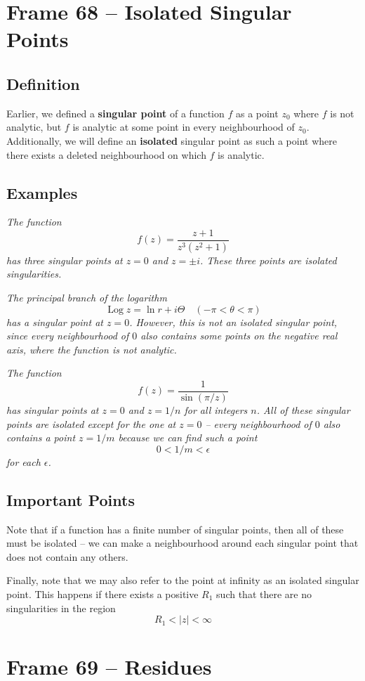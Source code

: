 \documentclass{article}
\renewcommand{\emph}{\textbf}
\DeclareMathOperator{\Log}{Log}
\begin{document}
\section{Frame 68 -- Isolated Singular Points}
\subsection{Definition}
Earlier, we defined a \emph{singular point} of a function $f$ as a point $z_0$ where $f$ is not analytic, but $f$ is analytic at some point in every neighbourhood of $z_0$. Additionally, we will define an \emph{isolated} singular point as such a point where there exists a deleted neighbourhood on which $f$ is analytic.

\subsection{Examples}
\textit{The function
\[
	f(z) = \frac{z+1}{z^3 (z^2 + 1)}
\]
has three singular points at $z = 0$ and $z = \pm i$. These three points are isolated singularities.}

\textit{The principal branch of the logarithm
\[
	\Log z = \ln r + i\Theta 	\quad (-\pi < \theta < \pi)
\]
has a singular point at $z = 0$. However, this is not an isolated singular point, since every neighbourhood of $0$ also contains some points on the negative real axis, where the function is not analytic.}

\textit{The function
\[
	f(z) = \frac{1}{\sin(\pi / z)}
\]
has singular points at $z = 0$ and $z = 1/n$ for all integers $n$. All of these singular points are isolated except for the one at $z = 0$ -- every neighbourhood of $0$ also contains a point $z = 1/m$ because we can find such a point
\[
	0 < 1/m < \epsilon
\]
for each $\epsilon$.}

\subsection{Important Points}
Note that if a function has a finite number of singular points, then all of these must be isolated -- we can make a neighbourhood around each singular point that does not contain any others.

Finally, note that we may also refer to the point at infinity as an isolated singular point. This happens if there exists a positive $R_1$ such that there are no singularities in the region
\[
	R_1 < |z| < \infty
\]


\clearpage
\section{Frame 69 -- Residues}
\end{document}
